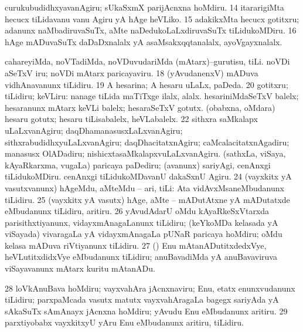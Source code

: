  curukubudidhxyavanAgiru; sUkaSxmX parijAcnxna hoMdiru. 
\eanum
\numie
\num{14}  itararigiMta hecucx tiLidavanu \mo vanu Agiru yA hAge heVLiko. 
\num{15}  adakikxMta hecucx gotitxru; adanunx naMbadiruvaSuTx, aMte naDedukoLaLxdiruvaSuTx tiLidukoMDiru. 
\num{16}  hAge mADuvaSuTx daDaDxnalalx yA asaMsakxqqtanalalx, ayoVgayxnalalx. 
  
\banum
{} cahareyiMda, noVTadiMda, noVDuvudariMda (mAtarx)--gurutisu, tiLi. 
 noVDi aSeTxV iru; noVDi mAtarx paricayaviru. 
\eanum
\numie
\num{18}  (yAvudanenxV) mADuva vidhAnavanunx tiLidiru. 
\num{19}  A hesarina; A hesaru uLaLx, paDeda. 
\num{20}  gotitxru; tiLidiru; keVLiru:  nanage tiLida maTiTxge ilalx, alalx. 
  
\banum
{} hesariniMdaSeTxV balelx; hesaranunx mAtarx keVLi balelx; hesaraSeTxV gotutx. 
 (obabxna, oMdara) hesaru gotutx; hesaru tiLisabalelx, heVLabalelx. 
\eanum
\numie
\num{22}  sithxra saMkalapx uLaLxvanAgiru; daqDhamanasusxLaLxvanAgiru; sithxrabudidhxyuLaLxvanAgiru; daqDhacitatxnAgiru; caMcalacitatxnAgadiru; manasusx OlADadiru; nishicxtasaMkalapxvuLaLxvanAgiru. 
  
\banum
{} (sathxLa, viSaya, kAyaRkarxma, \mo vugaLa) paricaya paDediru; (avanunx) sariyAgi, cenAnxgi tiLidukoMDiru. 
 cenAnxgi tiLidukoMDavanU dakaSxnU Agiru. 
\eanum
\numie
\num{24}  (vayxkitx yA vasutxvanunx) hAgeMdu, aMteMdu -- ari, tiLi:  Ata vidAvxMsaneMbudanunx tiLidiru. 
\num{25}  (vayxkitx yA vasutx) hAge, aMte -- mADutAtxne yA mADutatxde eMbudanunx tiLidiru, aritiru. 
\num{26}   yAvudAdarU oMdu kAyaRkeSxVtarxda parisithxtiyanunx, vidayxmAnagaLanunx tiLidiru; (keYkoMDa kelasada yA viSayada) vivaragaLa yA vidayxmAnagaLa pUNaR paricaya hoMdiru; oMdu kelasa mADuva riVtiyanunx tiLidiru. 
\num{27}  (\AmA) Enu mAtanADutitxdedxVye, heVLutitxdidxVye eMbudanunx tiLidiru; anuBavadiMda yA anuBavaviruva viSayavanunx mAtarx kuritu mAtanADu. 
\num{28}  loVkAnuBava hoMdiru; vayxvahAra jAcnxnaviru; Enu, etatx enunxvudanunx tiLidiru; parxpaMcada vasutx matutx vayxvahAragaLa bagegx sariyAda yA sAkaSuTx sAmAnayx jAcnxna hoMdiru; yAvudu Enu eMbudanunx aritiru. 
\num{29}  parxtiyobabx vayxkitxyU yAru Enu eMbudanunx aritiru, tiLidiru. 
